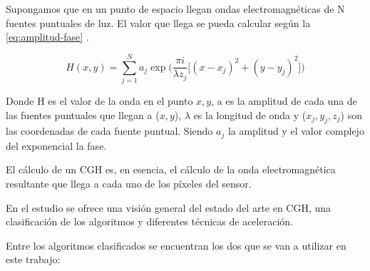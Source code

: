 \documentclass[10pt, a4paper]{article}
\begin{document}
Supongamos que en un punto de espacio llegan ondas electromagnéticas de N fuentes puntuales de luz. El valor que llega se pueda calcular según la \autoref{eq:amplitud-fase} \cite{Goodman:2017}.

\begin{equation}
H(x,y) = \sum\limits_{j=1}^N a_j\exp\Big(\frac{\pi i}{\lambda z_j}\big[(x-x_j)^2 + (y-y_j)^2 \big]\Big)
\label{eq:amplitud-fase}
\end{equation}

Donde H es el valor de la onda en el punto $x,y$, a es la amplitud de cada una de las fuentes puntuales que llegan a ($x,y$), $\lambda$ es la longitud de onda y ($x_{j},y_{j},z_{j}$) son las coordenadas de cada fuente puntual. Siendo $a_j$ la amplitud y el valor complejo del exponencial la fase.

El cálculo de un CGH es, en esencia, el cálculo de la onda electromagnética resultante que llega a cada uno de los píxeles del sensor.

En el estudio \cite{Blinder:2022} se ofrece una visión general del estado del arte en CGH, una clasificación de los algoritmos y diferentes técnicas de aceleración.

Entre los algoritmos clasificados se encuentran los dos que se van a utilizar en este trabajo:
\end{document}
